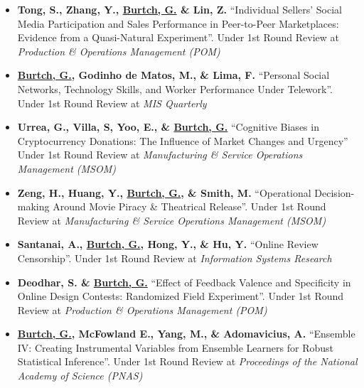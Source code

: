 \documentclass[10.5pt,letterpaper,sans]{moderncv}        %
\begin{document}
\begin{itemize}[leftmargin=!,labelindent=5pt,itemindent=-15pt]


\item \textbf{Tong, S., Zhang, Y., \underline{Burtch, G.} \& Lin, Z.} ``Individual Sellers' Social Media Participation and Sales Performance in Peer-to-Peer Marketplaces: Evidence from a Quasi-Natural Experiment''. Under 1st Round Review at \textit{Production \& Operations Management (POM)} 

\item \textbf{\underline{Burtch, G.}, Godinho de Matos, M., \& Lima, F.} ``Personal Social Networks, Technology Skills, and Worker Performance Under Telework''. Under 1st Round Review at \textit{MIS Quarterly}

\item \textbf{Urrea, G., Villa, S, Yoo, E., \& \underline{Burtch, G.}} ``Cognitive Biases in Cryptocurrency Donations: The Influence of Market Changes and Urgency'' Under 1st Round Review at \textit{Manufacturing \& Service Operations Management (MSOM)}

\item \textbf{Zeng, H., Huang, Y., \underline{Burtch, G.}, \& Smith, M.} ``Operational Decision-making Around Movie Piracy \& Theatrical Release''. Under 1st Round Review at \textit{Manufacturing \& Service Operations Management (MSOM)}

\item \textbf{Santanai, A., \underline{Burtch, G.}, Hong, Y., \& Hu, Y.} ``Online Review Censorship''. Under 1st Round Review at \textit{Information Systems Research}

\item \textbf{Deodhar, S. \& \underline{Burtch, G.}} ``Effect of Feedback Valence and Specificity in Online Design Contests: Randomized Field Experiment''. Under 1st Round Review at \textit{Production \& Operations Management (POM)}

\item \textbf{\underline{Burtch, G.}, McFowland E., Yang, M., \& Adomavicius, A.} ``Ensemble IV: Creating Instrumental Variables from Ensemble Learners for Robust Statistical Inference''. Under 1st Round Review at \textit{Proceedings of the National Academy of Science (PNAS)}

\end{itemize}
\end{document}
